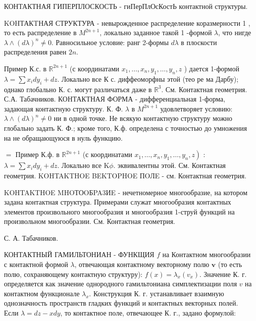 \documentclass[10pt]{article}
\begin{document}
КОНТАКТНАЯ ГИПЕРПЛОСКОСТЬ - гиПерПлОсКостЬ контактной структуры.



KOHТАКTНАЯ СТРУКТУРА - невырожденное распределение коразмерности 1 , то есть распределение в $M^{2 n+1}$, локально заданное такой 1 -формой $\lambda$, что нигде $\lambda \wedge(d \lambda)^{n} \neq 0$. Равносильное условие: ранг 2-формы $d \lambda$ в плоскости распределения равен $2 n$.



Пример К.с. в $\mathbb{R}^{2 n+1}$ (с координатами $x_{1}, \ldots, x_{n}, y_{1}, \ldots, y_{n}, z$ ) дается 1-формой $\lambda=\sum x_{i} d y_{i}+d z$. Локально все К с. диффеоморфны этой (тео ре ма Дарбу); однако глобально К. с. могут различаться даже в $\mathbb{R}^{3}$. См. Контактная геометрия. С.А. Табачников. КОНТАКТНАЯ ФОРМА - дифференциальная 1-форма, задающая контактную структуру. К. Ф. $\lambda$ в $M^{2 n+1}$ удовлетворяет условию: $\lambda \wedge(d \lambda)^{n} \neq 0$ ни в одной точке. Не всякую контактную структуру можно глобально задать К. Ф.; кроме того, К.ф. определена с точностью до умножения на не обращающуюся в нуль функцию.



$=$ Пример К.ф. в $\mathbb{R}^{2 n+1}$ (с координатами $\left.x_{1}, \ldots, x_{n}, y_{1}, \ldots, y_{n}, z\right)$ : $\lambda=\sum x_{i} d y_{i}+d z$. Локально все $\mathrm{K} \phi$. эквивалентны этой. См. Контактная геометрия. KOHTAKTHOE BEKTOPHOE ПOЛE - см. Контактная геометрия.



KOHTAKTHOE MHOТОOБPA3ИE - нечетномерное многообразие, на котором задана контактная структура. Примерами служат многообразия контактных элементов произвольного многообразия и многообразия 1-струй функций на произвольном многообразии. См. Контактная геометрия.



С. А. Табачников.



КОНТАКТНЫЙ ГАМИЛЬТОНИАН - ФУНКЩИЯ $f$ на Контактном многообразии с контактной формой $\lambda$, отвечающая контактному векторному полю $\boldsymbol{v}$ (то есть полю, сохраняющему контактную структуру): $f(x)=\lambda_{x}\left(v_{x}\right)$. Значение К. г. определяется как значение однородного гамильтониана симплектизации поля $v$ на контактном функционале $\lambda_{x}$. Конструкция К. г. устанавливает взаимную однозначность пространств гладких функций и контактных векторных полей. Если $\lambda=d z-x d y$, то контактное поле, отвечающее К. г., задано формулой:
\end{document}
